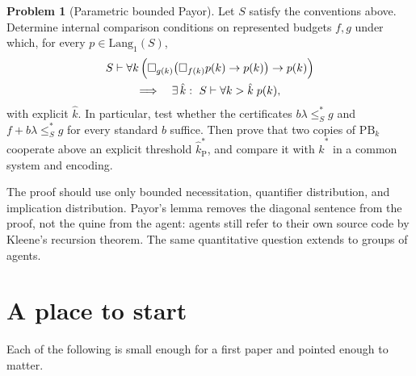 \documentclass[11pt]{amsart}
\theoremstyle{plain}
\theoremstyle{definition}
\newtheorem{problem}[theorem]{Problem}
\newcommand{\Lang}{\mathrm{Lang}}
\newcommand{\leSstar}{\mathrel{\leq_S^{*}}}
\begin{document}
\begin{problem}[Parametric bounded Payor]
\label{prob:payor}
Let $S$ satisfy the conventions above. Determine internal comparison conditions on represented budgets $f,g$ under which, for every $p\in\Lang_1(S)$,
\begin{multline*}
S \vdash \forall k\,\Bigl(
  \Box_{g(k)}\bigl(\Box_{f(k)}p(k)\to p(k)\bigr)\to p(k)
\Bigr)\\
\Longrightarrow\quad
\exists\,\hat{k}:\ S\vdash\forall k>\hat{k}\;p(k),
\end{multline*}
with explicit $\hat{k}$. In particular, test whether the certificates $b\lambda\leSstar g$ and $f+b\lambda\leSstar g$ for every standard $b$ suffice. Then prove that two copies of $\mathrm{PB}_k$ cooperate above an explicit threshold $\hat{k}^{*}_{\mathrm P}$, and compare it with $\hat{k}^{*}$ in a common system and encoding.
\end{problem}

The proof should use only bounded necessitation, quantifier distribution, and implication distribution. Payor's lemma removes the diagonal sentence from the proof, not the quine from the agent: agents still refer to their own source code by Kleene's recursion theorem. The same quantitative question extends to groups of agents.

\section{A place to start}
\label{sec:start}

Each of the following is small enough for a first paper and pointed enough to matter.
\end{document}
